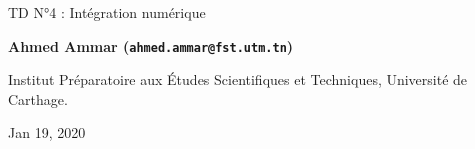 \documentclass[%
oneside,                 %
final,                   %
10pt,french]{article}
\begin{document}

\newcommand{\exercisesection}[1]{\subsection*{#1}}






\thispagestyle{empty}

\begin{center}
{\LARGE\bf
\begin{spacing}{1.25}
TD N°4 : Intégration numérique
\end{spacing}
}
\end{center}


\begin{center}
{\bf Ahmed Ammar (\texttt{ahmed.ammar@fst.utm.tn})}
\end{center}

    \begin{center}
\centerline{{\small Institut Préparatoire aux Études Scientifiques et Techniques, Université de Carthage.}}
\end{center}
    

\begin{center}
Jan 19, 2020
\end{center}

\vspace{1cm}


\tableofcontents


\vspace{1cm} %



\end{document}
